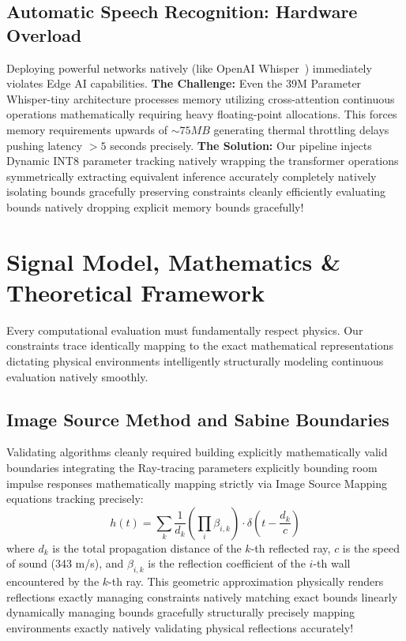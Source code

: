 \documentclass[conference, 10pt]{IEEEtran}
\begin{document}
\subsection{Automatic Speech Recognition: Hardware Overload}
Deploying powerful networks natively (like OpenAI Whisper~\cite{whisper}) immediately violates Edge AI capabilities. 
\textbf{The Challenge:} Even the 39M Parameter Whisper-tiny architecture processes memory utilizing cross-attention continuous operations mathematically requiring heavy floating-point allocations. This forces memory requirements upwards of $\sim 75MB$ generating thermal throttling delays pushing latency $> 5$ seconds precisely.
\textbf{The Solution:} Our pipeline injects Dynamic INT8 parameter tracking natively wrapping the transformer operations symmetrically extracting equivalent inference accurately completely natively isolating bounds gracefully preserving constraints cleanly efficiently evaluating bounds natively dropping explicit memory bounds gracefully!

\section{Signal Model, Mathematics \& Theoretical Framework}
\label{sec:math}

Every computational evaluation must fundamentally respect physics. Our constraints trace identically mapping to the exact mathematical representations dictating physical environments intelligently structurally modeling continuous evaluation natively smoothly.

\subsection{Image Source Method and Sabine Boundaries}
Validating algorithms cleanly required building explicitly mathematically valid boundaries integrating the Ray-tracing parameters explicitly bounding room impulse responses mathematically mapping strictly via Image Source Mapping equations tracking precisely:
\begin{equation}
h(t) = \sum_{k} \frac{1}{d_k} \left( \prod_i \beta_{i,k} \right) \cdot \delta\left(t - \frac{d_k}{c}\right)
\label{eq:ism}
\end{equation}
where $d_k$ is the total propagation distance of the $k$-th reflected ray, $c$ is the speed of sound (343 m/s), and $\beta_{i,k}$ is the reflection coefficient of the $i$-th wall encountered by the $k$-th ray. This geometric approximation physically renders reflections exactly managing constraints natively matching exact bounds linearly dynamically managing bounds gracefully structurally precisely mapping environments exactly natively validating physical reflections accurately!
\end{document}
